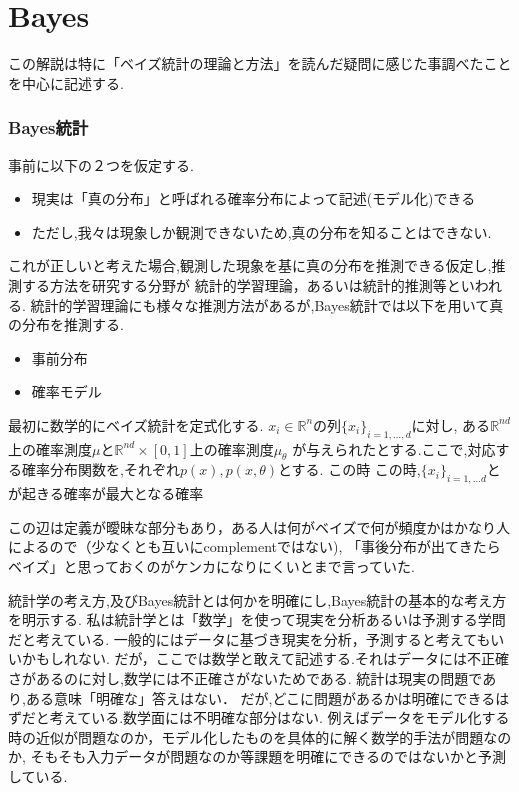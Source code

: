 \documentclass{ujarticle}
\begin{document}
\part{Bayes}
この解説は特に「ベイズ統計の理論と方法」を読んだ疑問に感じた事調べたことを中心に記述する.
\section{Bayes統計}
\label{sec:Bayes統計}


事前に以下の２つを仮定する.
\begin{itemize}
  \item 現実は「真の分布」と呼ばれる確率分布によって記述(モデル化)できる
  \item ただし,我々は現象しか観測できないため,真の分布を知ることはできない.
\end{itemize}
これが正しいと考えた場合,観測した現象を基に真の分布を推測できる仮定し,推測する方法を研究する分野が
統計的学習理論，あるいは統計的推測等といわれる.
統計的学習理論にも様々な推測方法があるが,Bayes統計では以下を用いて真の分布を推測する.
\begin{itemize}
  \item 事前分布
  \item 確率モデル
\end{itemize}

最初に数学的にベイズ統計を定式化する.
$x_i \in \mathbb{R}^n$の列$\{ x_i \}_{i= 1,\dots ,d}$に対し,
ある$\mathbb{R}^{nd}$上の確率測度$\mu$と$\mathbb{R}^{nd}\times [0,1]$上の確率測度$\mu_{\theta}$
が与えられたとする.ここで,対応する確率分布関数を,それぞれ$p(x),p(x,\theta)$とする.
この時
この時,$\{ x_i \}_{i= 1,\dots d}$とが起きる確率が最大となる確率


\begin{rem}
この辺は定義が曖昧な部分もあり，ある人は何がベイズで何が頻度かはかなり人によるので（少なくとも互いにcomplementではない),
「事後分布が出てきたらベイズ」と思っておくのがケンカになりにくいとまで言っていた.
\end{rem}


統計学の考え方,及びBayes統計とは何かを明確にし,Bayes統計の基本的な考え方を明示する.
私は統計学とは「数学」を使って現実を分析あるいは予測する学問だと考えている.
一般的にはデータに基づき現実を分析，予測すると考えてもいいかもしれない.
だが，ここでは数学と敢えて記述する.それはデータには不正確さがあるのに対し,数学には不正確さがないためである.
統計は現実の問題であり,ある意味「明確な」答えはない．
だが,どこに問題があるかは明確にできるはずだと考えている.数学面には不明確な部分はない.
例えばデータをモデル化する時の近似が問題なのか，モデル化したものを具体的に解く数学的手法が問題なのか,
そもそも入力データが問題なのか等課題を明確にできるのではないかと予測している.
\end{document}
